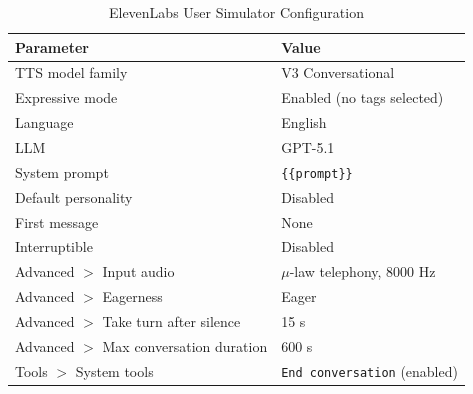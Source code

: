 
\begin{table}[h]
    \centering
    \caption{ElevenLabs User Simulator Configuration}
    \label{tab:elevenlabs-config}
    \begin{tabular}{ll}
    \toprule
    \textbf{Parameter} & \textbf{Value} \\
    \midrule
    TTS model family                      & V3 Conversational \\
    Expressive mode                       & Enabled (no tags selected) \\
    Language                              & English \\
    LLM                                   & GPT-5.1 \\
    System prompt                         & \texttt{\{\{prompt\}\}} \\
    Default personality                   & Disabled \\
    First message                         & None \\
    Interruptible                         & Disabled \\
    Advanced $>$ Input audio              & $\mu$-law telephony, 8000 Hz \\
    Advanced $>$ Eagerness                & Eager \\
    Advanced $>$ Take turn after silence  & 15 s \\
    Advanced $>$ Max conversation duration & 600 s \\
    Tools $>$ System tools                & \texttt{End conversation} (enabled) \\
    \bottomrule
    \end{tabular}
    \end{table}